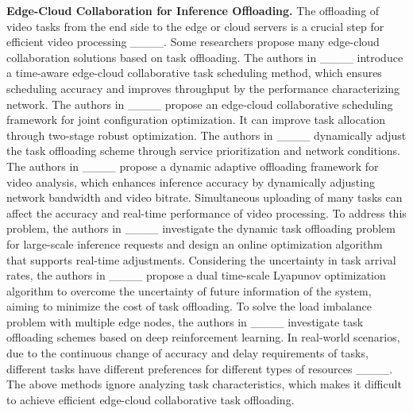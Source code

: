 \par
\textbf{Edge-Cloud Collaboration for Inference Offloading.} The offloading of video tasks from the end side to the edge or cloud servers is a crucial step for efficient video processing ____. Some researchers propose many edge-cloud collaboration solutions based on task offloading. The authors in ____ introduce a time-aware edge-cloud collaborative task scheduling method, which ensures scheduling accuracy and improves throughput by the performance characterizing network. The authors in ____ propose an edge-cloud collaborative scheduling framework for joint configuration optimization. It can improve task allocation through two-stage robust optimization. The authors in ____ dynamically adjust the task offloading scheme through service prioritization and network conditions. The authors in ____ propose a dynamic adaptive offloading framework for video analysis, which enhances inference accuracy by dynamically adjusting network bandwidth and video bitrate. Simultaneous uploading of many tasks can affect the accuracy and real-time performance of video processing. To address this problem, the authors in ____ investigate the dynamic task offloading problem for large-scale inference requests and design an online optimization algorithm that supports real-time adjustments. Considering the uncertainty in task arrival rates, the authors in ____ propose a dual time-scale Lyapunov optimization algorithm to overcome the uncertainty of future information of the system, aiming to minimize the cost of task offloading. To solve the load imbalance problem with multiple edge nodes, the authors in ____ investigate task offloading schemes based on deep reinforcement learning. In real-world scenarios, due to the continuous change of accuracy and delay requirements of tasks, different tasks have different preferences for different types of resources ____. The above methods ignore analyzing task characteristics, which makes it difficult to achieve efficient edge-cloud collaborative task offloading.